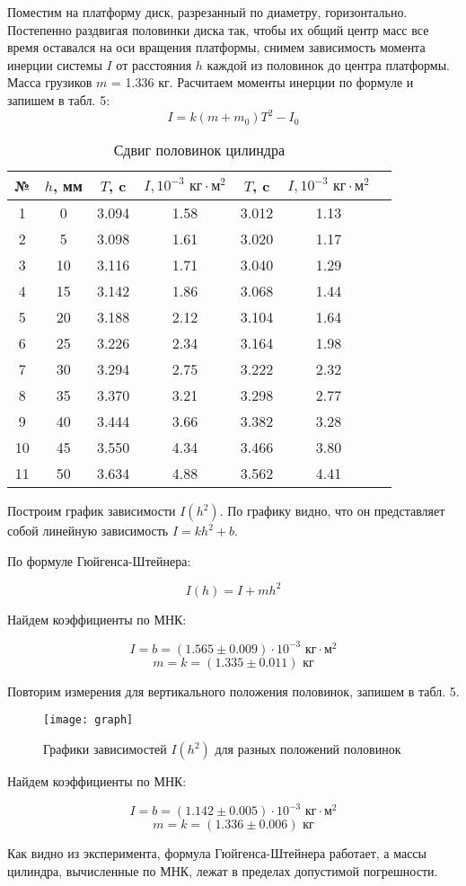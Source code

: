 \documentclass[12pt]{article}
\begin{document}
		\item Поместим на платформу диск, разрезанный по диаметру, горизонтально. Постепенно раздвигая половинки диска так, чтобы их общий центр масс все время оставался на оси вращения платформы, снимем зависимость момента инерции системы $I$ от расстояния $h$ каждой из половинок до центра платформы. Масса грузиков $m$ = 1.336 кг. Расчитаем моменты инерции по формуле и запишем в табл. 5:
		\[I = k(m+m_0)T^2 - I_0\]
		\begin{table}[h]
			\centering
			\caption{Сдвиг половинок цилиндра}
			\begin{tabular}{|c|c||c|c||c|c|c|}
				\hline
				№ & $h$, мм & $T$, c & $I, 10^{-3} \text{ кг}\cdot\text{м}^2$ & $T$, c & $I, 10^{-3} \text{ кг}\cdot\text{м}^2$ \\
				\hline
				1  & 0  & 3.094 & 1.58 & 3.012 & 1.13 \\
				2  & 5  & 3.098 & 1.61 & 3.020 & 1.17 \\
				3  & 10 & 3.116 & 1.71 & 3.040 & 1.29 \\
				4  & 15 & 3.142 & 1.86 & 3.068 & 1.44 \\
				5  & 20 & 3.188 & 2.12 & 3.104 & 1.64 \\
				6  & 25 & 3.226 & 2.34 & 3.164 & 1.98 \\
				7  & 30 & 3.294 & 2.75 & 3.222 & 2.32 \\
				8  & 35 & 3.370 & 3.21 & 3.298 & 2.77 \\
				9  & 40 & 3.444 & 3.66 & 3.382 & 3.28 \\
				10 & 45 & 3.550 & 4.34 & 3.466 & 3.80 \\
				11 & 50 & 3.634 & 4.88 & 3.562 & 4.41 \\
				\hline
			\end{tabular}
		\end{table}
		
		Построим график зависимости $I(h^2)$. По графику видно, что он представляет собой линейную зависимость $I = kh^2 + b$.
		
		По формуле Гюйгенса-Штейнера:
		
		\[I(h) = I + mh^2\]
		
		Найдем коэффициенты по МНК:
		
		\[I = b = (1.565 \pm 0.009) \cdot 10^{-3} \text{ кг}\cdot\text{м}^2\]
		\[m = k = (1.335 \pm 0.011) \text{ кг}\]
		
		\item Повторим измерения для вертикального положения половинок, запишем в табл. 5.
		
		\begin{figure}[h]
			\centering
			\caption{Графики зависимостей $I(h^2)$ для разных положений половинок}
			\texttt{[image: graph]}
		\end{figure}
		
		Найдем коэффициенты по МНК:
		
		\[I = b = (1.142 \pm 0.005) \cdot 10^{-3} \text{ кг}\cdot\text{м}^2\]
		\[m = k = (1.336 \pm 0.006) \text{ кг}\]
		
		Как видно из эксперимента, формула Гюйгенса-Штейнера работает, а массы цилиндра, вычисленные по МНК, лежат в пределах допустимой погрешности.
\end{document}
